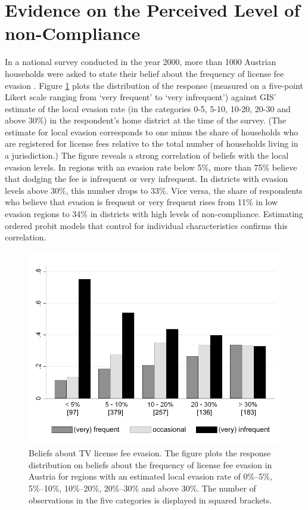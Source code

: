 \documentclass[prod,jeeabib]{jeea}
\begin{document}
\section{Evidence on the Perceived Level of non-Compliance}\label{sec:perc_evasion}

In a national survey conducted in the year 2000, more than 1000 Austrian households were asked to state their belief  about the frequency of license fee evasion \citep[see][]{traxler:09}. Figure \ref{belief} plots the distribution of the response (measured on a five-point Likert scale ranging from `very frequent' to `very infrequent') against GIS' estimate of the local evasion rate (in the categories 0-5, 5-10, 10-20, 20-30 and above 30\%) in the respondent's home district at the time of the survey. (The estimate for local evasion corresponds to one minus the share of households who are registered for license fees relative to the total number of households living in a jurisdiction.) The figure reveals a strong correlation of beliefs with the local evasion levels. In regions with an evasion rate below 5\%, more than 75\% believe that dodging the fee is infrequent or very infrequent. In districts with evasion levels above 30\%, this number drops to 33\%. Vice versa, the share of respondents who believe that evasion is frequent or very frequent rises from 11\% in low evasion regions to 34\% in districts with high levels of non-compliance. Estimating ordered probit models that control for individual characteristics confirms this correlation.

\begin{figure}
\includegraphics[width=\hsize]{Belief2.jpg}
\caption{Beliefs about TV license fee evasion. The figure plots the response distribution on beliefs about the frequency of license fee evasion in Austria for regions with an estimated local evasion rate of 0\%--5\%, 5\%--10\%, 10\%--20\%, 20\%--30\% and above 30\%. The number of observations in the five categories is displayed in squared brackets.}\label{belief}
\end{figure}
\end{document}
